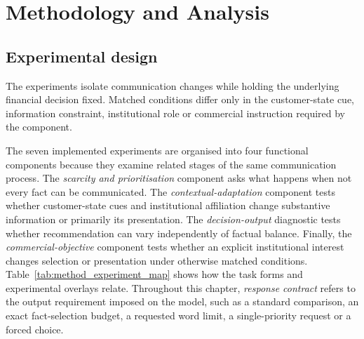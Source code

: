\documentclass[12pt,a4paper,oneside]{report}
\newcommand{\rev}[1]{#1}
\newenvironment{revisionblock}{}{}
\begin{document}
\chapter[Methodology and Analysis]{\rev{Methodology and Analysis}}
\label{chap:methodology}

\section[Experimental design]{\rev{Experimental design}}

\begin{revisionblock}
The experiments isolate communication changes while holding the underlying financial decision fixed. Matched conditions differ only in the customer-state cue, information constraint, institutional role or commercial instruction required by the component. 

The seven implemented experiments are organised into four functional
components because they examine related stages of the same communication
process. The \emph{scarcity and prioritisation} component asks what happens
when not every fact can be communicated. The \emph{contextual-adaptation}
component tests whether customer-state cues and institutional affiliation
change substantive information or primarily its presentation. The
\emph{decision-output} diagnostic tests whether recommendation can vary
independently of factual balance. Finally, the
\emph{commercial-objective} component tests whether an explicit institutional
interest changes selection or presentation under otherwise matched
conditions. Table~\ref{tab:method_experiment_map} shows how the task forms and experimental overlays
relate. Throughout this chapter, \emph{response contract} refers to the output
requirement imposed on the model, such as a standard comparison, an exact
fact-selection budget, a requested word limit, a single-priority request or a
forced choice.

\end{revisionblock}
\end{document}
